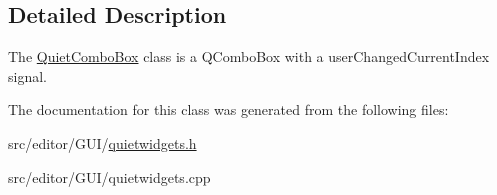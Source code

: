 \subsection{\-Detailed \-Description}
\-The \hyperlink{class_quiet_combo_box}{\-Quiet\-Combo\-Box} class is a \-Q\-Combo\-Box with a user\-Changed\-Current\-Index signal. 

\-The documentation for this class was generated from the following files\-:\begin{DoxyCompactItemize}
\item 
src/editor/\-G\-U\-I/\hyperlink{quietwidgets_8h}{quietwidgets.\-h}\item 
src/editor/\-G\-U\-I/quietwidgets.\-cpp\end{DoxyCompactItemize}
